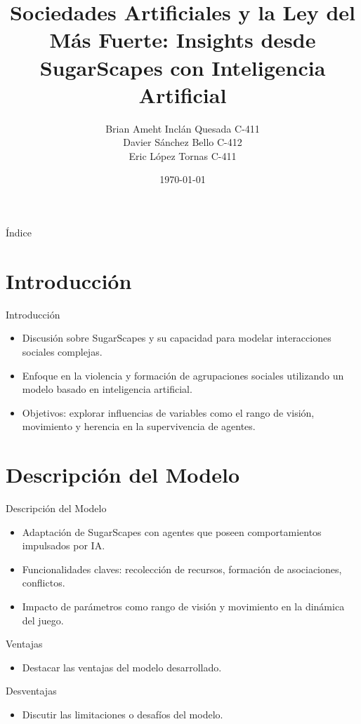 \documentclass{beamer}
\title{Sociedades Artificiales y la Ley del Más Fuerte: Insights desde SugarScapes con Inteligencia Artificial}
\author{Brian Ameht Inclán Quesada C-411 \\ Davier Sánchez Bello C-412 \\ Eric López Tornas C-411}
\date{\today}
\begin{document}
\begin{frame}
  \titlepage
\end{frame}

\begin{frame}{Índice}
  \tableofcontents
\end{frame}

\section{Introducción}
\begin{frame}{Introducción}
  \begin{itemize}
    \item Discusión sobre SugarScapes y su capacidad para modelar interacciones sociales complejas.
    \item Enfoque en la violencia y formación de agrupaciones sociales utilizando un modelo basado en inteligencia artificial.
    \item Objetivos: explorar influencias de variables como el rango de visión, movimiento y herencia en la supervivencia de agentes.
  \end{itemize}
\end{frame}

\section{Descripción del Modelo}
\begin{frame}{Descripción del Modelo}
  \begin{itemize}
    \item Adaptación de SugarScapes con agentes que poseen comportamientos impulsados por IA.
    \item Funcionalidades claves: recolección de recursos, formación de asociaciones, conflictos.
    \item Impacto de parámetros como rango de visión y movimiento en la dinámica del juego.
  \end{itemize}
\end{frame}

\begin{frame}{Ventajas}
  \begin{itemize}
    \item Destacar las ventajas del modelo desarrollado.
  \end{itemize}
\end{frame}

\begin{frame}{Desventajas}
  \begin{itemize}
    \item Discutir las limitaciones o desafíos del modelo.
  \end{itemize}
\end{frame}
\end{document}
